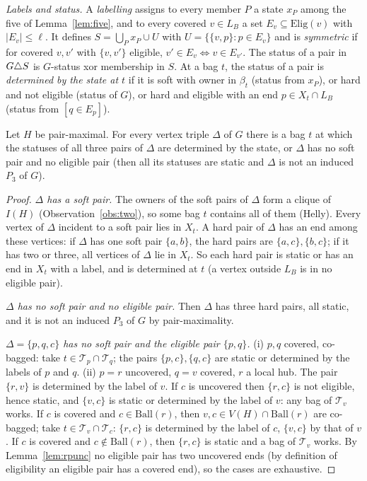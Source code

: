 \emph{Labels and status.} A \emph{labelling} assigns to every member $P$ a state $x_P$ among the five of Lemma~\ref{lem:five}, and to every covered $v\in L_B$ a set $E_v\subseteq\mathrm{Elig}(v)$ with $|E_v|\le\ell$. It defines $S=\bigcup_Px_P\cup U$ with $U=\{\{v,p\}:p\in E_v\}$ and is \emph{symmetric} if for covered $v,v'$ with $\{v,v'\}$ eligible, $v'\in E_v\iff v\in E_{v'}$. The status of a pair in $G\triangle S$ is $G$-status xor membership in $S$. At a bag $t$, the status of a pair is \emph{determined by the state at $t$} if it is soft with owner in $\beta_t$ (status from $x_P$), or hard and not eligible (status of $G$), or hard and eligible with an end $p\in X_t\cap L_B$ (status from $[q\in E_p]$).

\begin{lemma}[Visibility]\label{lem:rpvis}
Let $H$ be pair-maximal. For every vertex triple $\Delta$ of $G$ there is a bag $t$ at which the statuses of all three pairs of $\Delta$ are determined by the state, or $\Delta$ has no soft pair and no eligible pair (then all its statuses are static and $\Delta$ is not an induced $P_3$ of $G$).
\end{lemma}
\begin{proof}
\emph{$\Delta$ has a soft pair.} The owners of the soft pairs of $\Delta$ form a clique of $I(H)$ (Observation~\ref{obs:two}), so some bag $t$ contains all of them (Helly). Every vertex of $\Delta$ incident to a soft pair lies in $X_t$. A hard pair of $\Delta$ has an end among these vertices: if $\Delta$ has one soft pair $\{a,b\}$, the hard pairs are $\{a,c\},\{b,c\}$; if it has two or three, all vertices of $\Delta$ lie in $X_t$. So each hard pair is static or has an end in $X_t$ with a label, and is determined at $t$ (a vertex outside $L_B$ is in no eligible pair).

\emph{$\Delta$ has no soft pair and no eligible pair.} Then $\Delta$ has three hard pairs, all static, and it is not an induced $P_3$ of $G$ by pair-maximality.

\emph{$\Delta=\{p,q,c\}$ has no soft pair and the eligible pair $\{p,q\}$.} (i) $p,q$ covered, co-bagged: take $t\in\mathcal T_p\cap\mathcal T_q$; the pairs $\{p,c\},\{q,c\}$ are static or determined by the labels of $p$ and $q$. (ii) $p=r$ uncovered, $q=v$ covered, $r$ a local hub. The pair $\{r,v\}$ is determined by the label of $v$. If $c$ is uncovered then $\{r,c\}$ is not eligible, hence static, and $\{v,c\}$ is static or determined by the label of $v$: any bag of $\mathcal T_v$ works. If $c$ is covered and $c\in\mathrm{Ball}(r)$, then $v,c\in V(H)\cap\mathrm{Ball}(r)$ are co-bagged; take $t\in\mathcal T_v\cap\mathcal T_c$: $\{r,c\}$ is determined by the label of $c$, $\{v,c\}$ by that of $v$. If $c$ is covered and $c\notin\mathrm{Ball}(r)$, then $\{r,c\}$ is static and a bag of $\mathcal T_v$ works. By Lemma~\ref{lem:rpunc} no eligible pair has two uncovered ends (by definition of eligibility an eligible pair has a covered end), so the cases are exhaustive.
\end{proof}

